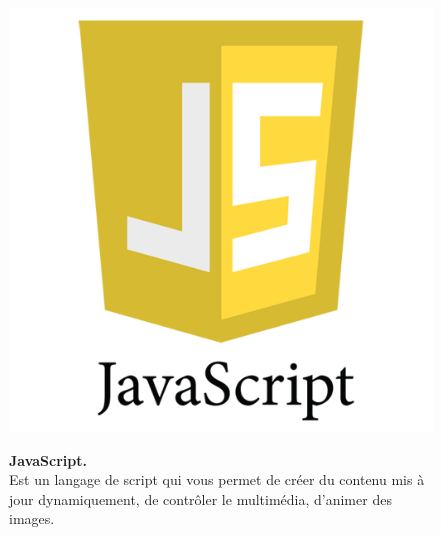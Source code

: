 \begin{figure}[H]
    \centering
    \begin{minipage}[c]{0.3\textwidth}
        \includegraphics[width=\linewidth]{projet/images/diagramme de sequance/images/JavaScript.png}
    \end{minipage}
    \hspace{1cm}
    \begin{minipage}[c]{0.6\textwidth}
        \textbf{JavaScript.}\\[0.5em]
       Est un langage de script qui vous permet de créer du contenu
mis à jour dynamiquement, de contrôler le multimédia, d’animer des
images. \cite{ref11}
    \end{minipage}
\end{figure}

\vspace{0.5cm}

